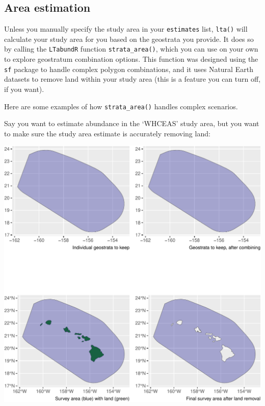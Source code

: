 \documentclass[
]{book}
\newenvironment{Shaded}{\begin{snugshade}}{\end{snugshade}}
\newcommand{\AttributeTok}[1]{\textcolor[rgb]{0.77,0.63,0.00}{#1}}
\newcommand{\ConstantTok}[1]{\textcolor[rgb]{0.00,0.00,0.00}{#1}}
\newcommand{\FunctionTok}[1]{\textcolor[rgb]{0.00,0.00,0.00}{#1}}
\newcommand{\NormalTok}[1]{#1}
\newcommand{\OtherTok}[1]{\textcolor[rgb]{0.56,0.35,0.01}{#1}}
\newcommand{\SpecialCharTok}[1]{\textcolor[rgb]{0.00,0.00,0.00}{#1}}
\newcommand{\StringTok}[1]{\textcolor[rgb]{0.31,0.60,0.02}{#1}}
\begin{document}
\hypertarget{area-estimation}{%
\subsection*{Area estimation}\label{area-estimation}}

Unless you manually specify the study area in your \texttt{estimates} list, \texttt{lta()} will calculate your study area for you based on the geostrata you provide. It does so by calling the \texttt{LTabundR} function \texttt{strata\_area()}, which you can use on your own to explore geostratum combination options. This function was designed using the \texttt{sf} package to handle complex polygon combinations, and it uses Natural Earth datasets to remove land within your study area (this is a feature you can turn off, if you want).

Here are some examples of how \texttt{strata\_area()} handles complex scenarios.

Say you want to estimate abundance in the `WHCEAS' study area, but you want to make sure the study area estimate is accurately removing land:

\begin{Shaded}
\end{Shaded}

\includegraphics{figures/unnamed-chunk-253-1.pdf}
\end{document}
